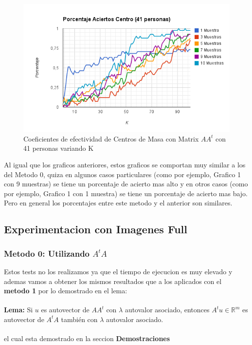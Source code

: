 \begin{figure}[H]
\includegraphics[width=1\textwidth]{img/imager.png}
     \caption{Coeficientes de efectividad de Centros de Masa con Matrix $AA^t$ con 41 personas variando K}
\end{figure}

Al igual que los graficos anteriores, estos graficos se comportan muy similar a los del Metodo 0, quiza en algunos casos particulares (como por ejemplo, Grafico 1 con 9 muestras) se tiene un porcentaje de acierto mas alto y en otros casos (como por ejemplo, Grafico 1 con 1 muestra) se tiene un porcentaje de acierto mas bajo. Pero en general los porcentajes entre este metodo y el anterior son similares.

\subsection{Experimentacion con Imagenes Full}

\subsubsection{Metodo 0: Utilizando $A^tA$}

Estos tests no los realizamos ya que el tiempo de ejecucion es muy elevado y ademas vamos  a obtener los mismos resultados que a los aplicados con el \textbf{metodo 1} por lo demostrado en el lema:
\\
\\
\textbf{Lema:} Si $u$ es autovector de $A A^t$ con $\lambda$ autovalor asociado, entonces $A^t u \in
\mathbb{R}^m$ es autovector de $A^t A$ también con $\lambda$ autovalor asociado.
\\
\\
 el cual esta demostrado en la seccion \textbf{Demostraciones}
 
